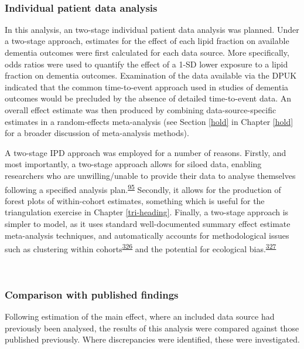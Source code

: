 \documentclass[a4paper, twoside]{templates/ociamthesis}
\begin{document}
~

\hypertarget{individual-patient-data-analysis}{%
\subsubsection{Individual patient data analysis}\label{individual-patient-data-analysis}}

In this analysis, an two-stage individual patient data analysis was planned. Under a two-stage approach, estimates for the effect of each lipid fraction on available dementia outcomes were first calculated for each data source. More specifically, odds ratios were used to quantify the effect of a 1-SD lower exposure to a lipid fraction on dementia outcomes. Examination of the data available via the DPUK indicated that the common time-to-event approach used in studies of dementia outcomes would be precluded by the absence of detailed time-to-event data. An overall effect estimate was then produced by combining data-source-specific estimates in a random-effects meta-analysis (see Section \ref{hold} in Chapter \ref{hold} for a broader discussion of meta-analysis methods).

A two-stage IPD approach was employed for a number of reasons. Firstly, and most importantly, a two-stage approach allows for siloed data, enabling researchers who are unwilling/unable to provide their data to analyse themselves following a specified analysis plan.\textsuperscript{\protect\hyperlink{ref-riley2010}{95}} Secondly, it allows for the production of forest plots of within-cohort estimates, something which is useful for the triangulation exercise in Chapter \ref{tri-heading}. Finally, a two-stage approach is simpler to model, as it uses standard well-documented summary effect estimate meta-analysis techniques, and automatically accounts for methodological issues such as clustering within cohorts\textsuperscript{\protect\hyperlink{ref-abo-zaid2013}{326}} and the potential for ecological bias.\textsuperscript{\protect\hyperlink{ref-burke2017}{327}}

~

\hypertarget{comparison-with-published-findings}{%
\subsubsection{Comparison with published findings}\label{comparison-with-published-findings}}

Following estimation of the main effect, where an included data source had previously been analysed, the results of this analysis were compared against those published previously. Where discrepancies were identified, these were investigated.
\end{document}

